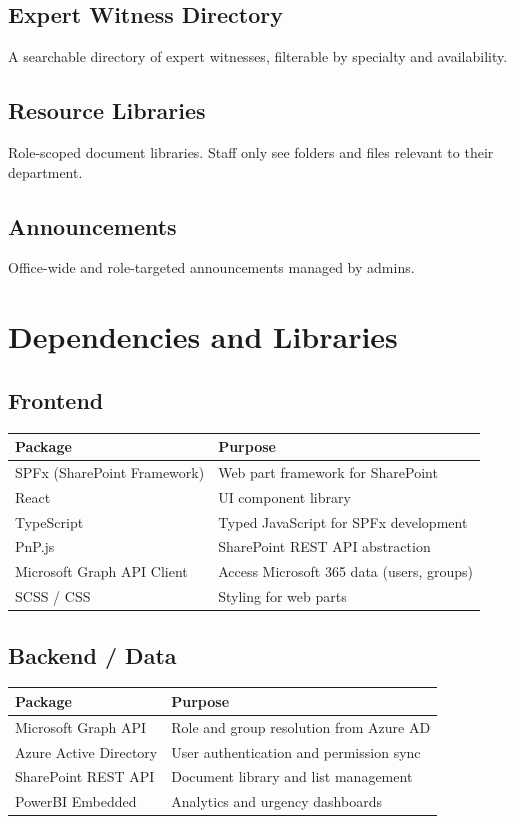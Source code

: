 \documentclass[12pt]{article}
\begin{document}
\subsection{Expert Witness Directory}
A searchable directory of expert witnesses, filterable by specialty and availability.

\subsection{Resource Libraries}
Role-scoped document libraries. Staff only see folders and files relevant to their department.

\subsection{Announcements}
Office-wide and role-targeted announcements managed by admins.

\section{Dependencies and Libraries}

\subsection{Frontend}
\begin{longtable}{|p{2.5in}|p{3.5in}|}
\hline
\textbf{Package} & \textbf{Purpose} \\ \hline
SPFx (SharePoint Framework) & Web part framework for SharePoint \\ \hline
React & UI component library \\ \hline
TypeScript & Typed JavaScript for SPFx development \\ \hline
PnP.js & SharePoint REST API abstraction \\ \hline
Microsoft Graph API Client & Access Microsoft 365 data (users, groups) \\ \hline
SCSS / CSS & Styling for web parts \\ \hline
\end{longtable}

\subsection{Backend / Data}
\begin{longtable}{|p{2.5in}|p{3.5in}|}
\hline
\textbf{Package} & \textbf{Purpose} \\ \hline
Microsoft Graph API & Role and group resolution from Azure AD \\ \hline
Azure Active Directory & User authentication and permission sync \\ \hline
SharePoint REST API & Document library and list management \\ \hline
PowerBI Embedded & Analytics and urgency dashboards \\ \hline
\end{longtable}
\end{document}
